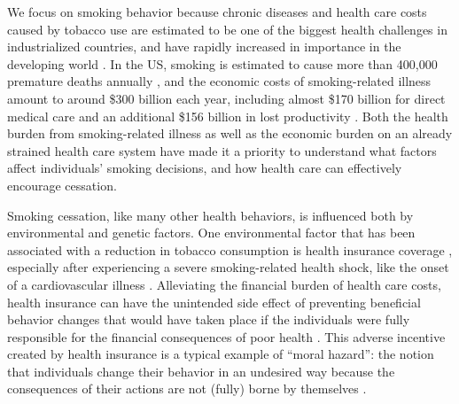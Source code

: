 \documentclass[11pt]{article}
\begin{document}
We focus on smoking behavior because chronic diseases and health care costs caused by tobacco use are estimated to be one of the biggest health challenges in industrialized countries, and have rapidly increased in importance in the developing world \citep{USDHHS2014,Goodchild2018}.
In the US, smoking is estimated to cause more than 400,000 premature deaths annually \citep{Ma2018}, and the economic costs of smoking-related illness amount to around \$300 billion each year, including almost \$170 billion for direct medical care and an additional \$156 billion in lost productivity \citep{USDHHS2014, Xu2015}.
Both the health burden from smoking-related illness as well as the economic burden on an already strained health care system have made it a priority to understand what factors affect individuals' smoking decisions, and how health care can effectively encourage cessation.

Smoking cessation, like many other health behaviors, is influenced both by environmental and genetic factors.
One environmental factor that has been associated with a reduction in tobacco consumption is health insurance coverage \citep{Dave2009,Richards2014,Marti2017}, especially after experiencing a severe smoking-related health shock, like the onset of a cardiovascular illness \citep{Clark2002,Falba2005,Khwaja2006learn,Keenan2009,Sundmacher2012}.
Alleviating the financial burden of health care costs, health insurance can have the unintended side effect of preventing beneficial behavior changes that would have taken place if the individuals were fully responsible for the financial consequences of poor health \citep{Marti2017}.
This adverse incentive created by health insurance is a typical example of ``moral hazard'': the notion that individuals change their behavior in an undesired way because the consequences of their actions are not (fully) borne by themselves \citep{Einav2018,Zweifel2000}.
\end{document}
